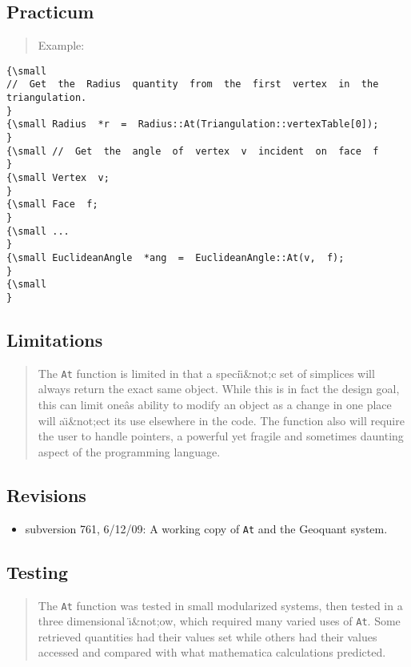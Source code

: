 \subsection*{Practicum}

\begin{quotation}
Example:{\small }
\end{quotation}

\begin{verbatim}
{\small 
//  Get  the  Radius  quantity  from  the  first  vertex  in  the  triangulation.
}
{\small Radius  *r  =  Radius::At(Triangulation::vertexTable[0]);
}
{\small //  Get  the  angle  of  vertex  v  incident  on  face  f
}
{\small Vertex  v;
}
{\small Face  f;
}
{\small ...
}
{\small EuclideanAngle  *ang  =  EuclideanAngle::At(v,  f);
}
{\small   
}
\end{verbatim}

\subsection*{Limitations}

\begin{quotation}
The \texttt{At} function is limited in that a speci\"{\i}\&not;c set of
simplices will always return the exact same object. While this is in fact
the design goal, this can limit one\^as ability to modify an object as a
change in one place will a\"{\i}\&not;ect its use elsewhere in the code. The
function also will require the user to handle pointers, a powerful yet
fragile and sometimes daunting aspect of the programming language.
\end{quotation}

\subsection*{Revisions}

\begin{itemize}
\item subversion 761, 6/12/09: A working copy of \texttt{At} and the
Geoquant system.
\end{itemize}

\subsection*{Testing}

\begin{quotation}
The \texttt{At} function was tested in small modularized systems, then
tested in a three dimensional \"{\i}\&not;ow, which required many varied
uses of \texttt{At}. Some retrieved quantities had their values set while
others had their values accessed and compared with what mathematica
calculations predicted.
\end{quotation}

